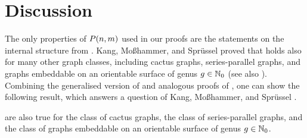 \section{Discussion}\label{LSsec:discussion}
The only properties of $P(n,m)$ used in our proofs are the statements on the internal structure from . Kang, Moßhammer, and Sprüssel \cite{KangMosshammerSpruessel2020} proved that  holds also for many other graph classes, including cactus graphs, series-parallel graphs, and graphs embeddable on an orientable surface of genus $g\in\mathbb{N}_0$ (see also \cite[Section 4]{KangMissethan2021}). Combining the generalised version of  and analogous proofs of , one can show the following result, which answers a question of Kang, Moßhammer, and Sprüssel \cite[Question 8.7]{KangMosshammerSpruessel2020}.
\begin{thm}\label{LSthm:general}
	 are also true for the class of cactus graphs, the class of series-parallel graphs, and the class of graphs embeddable on an orientable surface of genus $g\in \mathbb{N}_0$.
\end{thm}